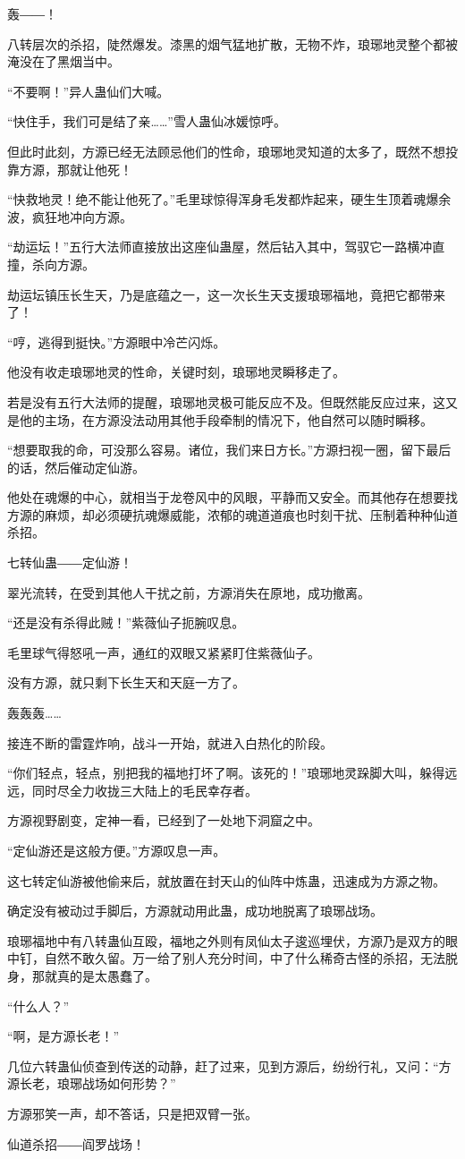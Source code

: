 \begin{this_body}
轰――！

八转层次的杀招，陡然爆发。漆黑的烟气猛地扩散，无物不炸，琅琊地灵整个都被淹没在了黑烟当中。

“不要啊！”异人蛊仙们大喊。

“快住手，我们可是结了亲……”雪人蛊仙冰媛惊呼。

但此时此刻，方源已经无法顾忌他们的性命，琅琊地灵知道的太多了，既然不想投靠方源，那就让他死！

“快救地灵！绝不能让他死了。”毛里球惊得浑身毛发都炸起来，硬生生顶着魂爆余波，疯狂地冲向方源。

“劫运坛！”五行大法师直接放出这座仙蛊屋，然后钻入其中，驾驭它一路横冲直撞，杀向方源。

劫运坛镇压长生天，乃是底蕴之一，这一次长生天支援琅琊福地，竟把它都带来了！

“哼，逃得到挺快。”方源眼中冷芒闪烁。

他没有收走琅琊地灵的性命，关键时刻，琅琊地灵瞬移走了。

若是没有五行大法师的提醒，琅琊地灵极可能反应不及。但既然能反应过来，这又是他的主场，在方源没法动用其他手段牵制的情况下，他自然可以随时瞬移。

“想要取我的命，可没那么容易。诸位，我们来日方长。”方源扫视一圈，留下最后的话，然后催动定仙游。

他处在魂爆的中心，就相当于龙卷风中的风眼，平静而又安全。而其他存在想要找方源的麻烦，却必须硬抗魂爆威能，浓郁的魂道道痕也时刻干扰、压制着种种仙道杀招。

七转仙蛊――定仙游！

翠光流转，在受到其他人干扰之前，方源消失在原地，成功撤离。

“还是没有杀得此贼！”紫薇仙子扼腕叹息。

毛里球气得怒吼一声，通红的双眼又紧紧盯住紫薇仙子。

没有方源，就只剩下长生天和天庭一方了。

轰轰轰……

接连不断的雷霆炸响，战斗一开始，就进入白热化的阶段。

“你们轻点，轻点，别把我的福地打坏了啊。该死的！”琅琊地灵跺脚大叫，躲得远远，同时尽全力收拢三大陆上的毛民幸存者。

方源视野剧变，定神一看，已经到了一处地下洞窟之中。

“定仙游还是这般方便。”方源叹息一声。

这七转定仙游被他偷来后，就放置在封天山的仙阵中炼蛊，迅速成为方源之物。

确定没有被动过手脚后，方源就动用此蛊，成功地脱离了琅琊战场。

琅琊福地中有八转蛊仙互殴，福地之外则有凤仙太子逡巡埋伏，方源乃是双方的眼中钉，自然不敢久留。万一给了别人充分时间，中了什么稀奇古怪的杀招，无法脱身，那就真的是太愚蠢了。

“什么人？”

“啊，是方源长老！”

几位六转蛊仙侦查到传送的动静，赶了过来，见到方源后，纷纷行礼，又问：“方源长老，琅琊战场如何形势？”

方源邪笑一声，却不答话，只是把双臂一张。

仙道杀招――阎罗战场！

\end{this_body}

